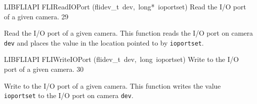 \documentclass{article}
\begin{document}
\begin{cxxfunction}
{LIBFLIAPI}
        {FLIReadIOPort}
        {(flidev\_t\ dev,\ long*\ ioportset)}
        {
 Read the I/O port of a given camera.}
        {29}
\begin{cxxdoc}

Read the I/O port of a given camera.  This function reads the I/O
port on camera \texttt{dev} and places the value in the location
pointed to by \texttt{ioportset}.


\end{cxxdoc}
\end{cxxfunction}
\begin{cxxfunction}
{LIBFLIAPI}
        {FLIWriteIOPort}
        {(flidev\_t\ dev,\ long\ ioportset)}
        {
 Write to the I/O port of a given camera.}
        {30}
\begin{cxxdoc}

Write to the I/O port of a given camera.  This function writes the
value \texttt{ioportset} to the I/O port on camera \texttt{dev}.


\end{cxxdoc}
\end{cxxfunction}
\end{document}
